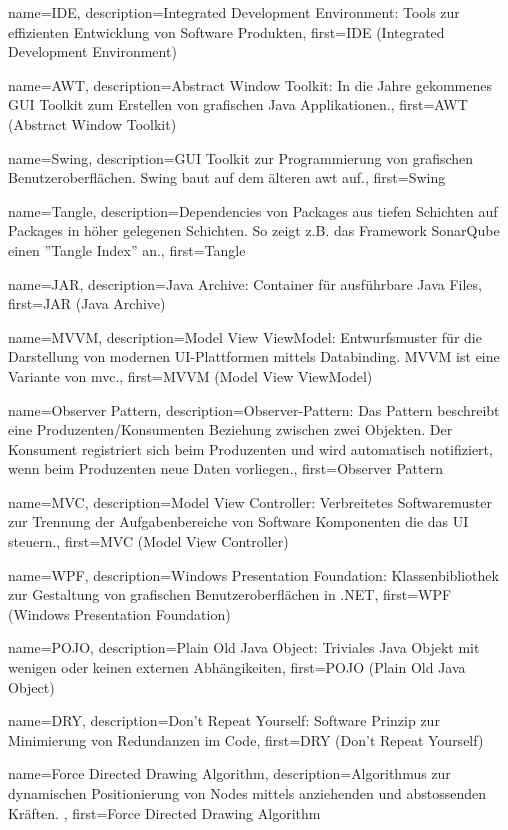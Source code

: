 {
	name={IDE},
	description={Integrated Development Environment: Tools zur effizienten Entwicklung von Software Produkten},
	first={IDE (Integrated Development Environment)}
}

{
	name={AWT},
	description={Abstract Window Toolkit: In die Jahre gekommenes GUI Toolkit zum Erstellen von grafischen Java Applikationen.},
	first={AWT (Abstract Window Toolkit)}
}

{
	name={Swing},
	description={GUI Toolkit zur Programmierung von grafischen Benutzeroberflächen. Swing baut auf dem älteren \gls{awt} auf.},
	first={Swing}
}

{
	name={Tangle},
	description={Dependencies von Packages aus tiefen Schichten auf Packages in höher gelegenen Schichten. So zeigt z.B. das Framework SonarQube einen ''Tangle Index'' an.},
	first={Tangle}
}


{
	name={JAR},
	description={Java Archive: Container für ausführbare Java Files},
	first={JAR (Java Archive)}
}

{
	name={MVVM},
	description={Model View ViewModel: Entwurfsmuster für die Darstellung von modernen UI-Plattformen mittels Databinding. MVVM ist eine Variante von \gls{mvc}.},
	first={MVVM (Model View ViewModel)}
}

{
	name={Observer Pattern},
	description={Observer-Pattern: Das Pattern beschreibt eine Produzenten/Konsumenten Beziehung zwischen zwei Objekten. Der Konsument registriert sich beim Produzenten und wird automatisch notifiziert, wenn beim Produzenten neue Daten vorliegen.},
	first={Observer Pattern}
}

{
	name={MVC},
	description={Model View Controller: Verbreitetes Softwaremuster zur Trennung der Aufgabenbereiche von Software Komponenten die das UI steuern.},
	first={MVC (Model View Controller)}
}

{
	name={WPF},
	description={Windows Presentation Foundation: Klassenbibliothek zur Gestaltung von grafischen Benutzeroberflächen in .NET},
	first={WPF (Windows Presentation Foundation)}
}

{
	name={POJO},
	description={Plain Old Java Object: Triviales Java Objekt mit wenigen oder keinen externen Abhängikeiten},
	first={POJO (Plain Old Java Object)}
}

{
	name={DRY},
	description={Don't Repeat Yourself: Software Prinzip zur Minimierung von Redundanzen im Code},
	first={DRY (Don't Repeat Yourself)}
}

{
	name={Force Directed Drawing Algorithm},
	description={Algorithmus zur dynamischen Positionierung von Nodes mittels anziehenden und abstossenden Kräften. },
	first={Force Directed Drawing Algorithm}
}



